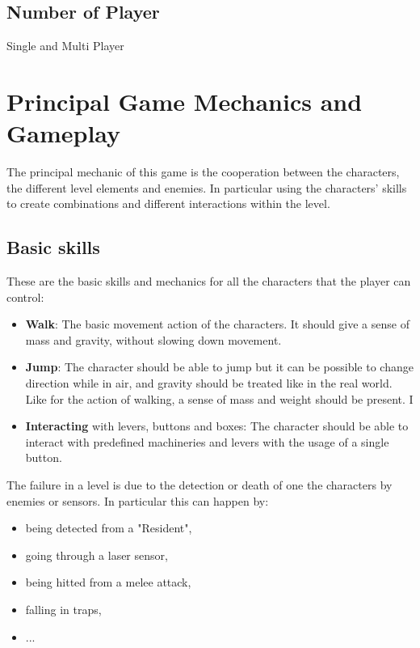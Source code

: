 \documentclass[12pt, a4paper]{report}
\begin{document}
\section*{Number of Player}
Single and Multi Player

\chapter{Principal Game Mechanics and Gameplay}
The principal mechanic of this game is the cooperation between the characters, the different level elements and enemies. In particular using the characters’ skills to create combinations and different interactions within the level.

\section*{Basic skills}
These are the basic skills and mechanics for all the characters that the player can control:
\begin{itemize}
	\item \textbf{Walk}: The basic movement action of the characters. It should give a sense of mass and gravity, without slowing down movement.
	\item \textbf{Jump}: The character should be able to jump but it can be possible to change direction while in air, and gravity should be treated like in the real world. Like for the action of walking, a sense of mass and weight should be present. 
	I\item \textbf{Interacting} with levers, buttons and boxes: The character should be able to interact with predefined machineries and levers with the usage of a single button.
\end{itemize}

The failure in a level is due to the detection or death of one the characters by enemies or sensors. In particular this can happen by:
\begin{itemize}
	\item being detected from a "Resident",
	\item going through a laser sensor,
	\item being hitted from a melee attack,
	\item falling in traps,
	\item ...
\end{itemize}
\end{document}
